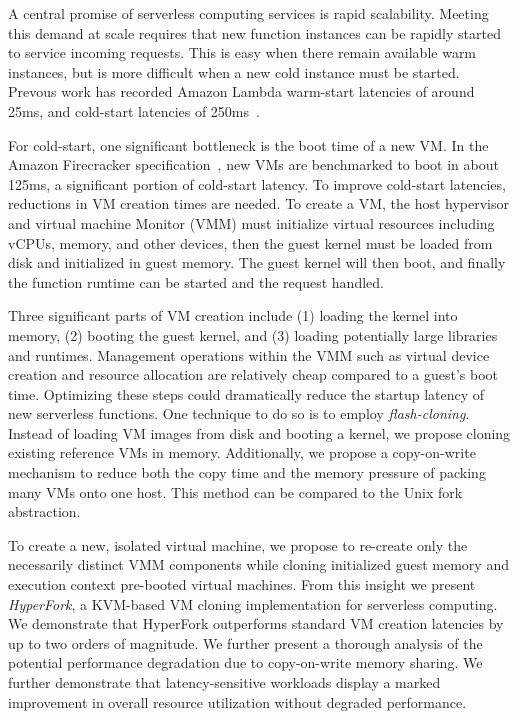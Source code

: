  A central promise of serverless computing
services is rapid scalability. Meeting this demand at scale requires that new
function instances can be rapidly started to service incoming requests. This is
easy when there remain available warm instances, but is more difficult when a
new cold instance must be started. Prevous work has recorded Amazon Lambda
warm-start latencies of around 25ms, and cold-start latencies of
250ms~\cite{peeking}.

For cold-start, one significant bottleneck is the boot time of a new VM. In the
Amazon Firecracker specification~\cite{firecracker-spec}, new VMs are
benchmarked to boot in about 125ms, a significant portion of cold-start
latency. To improve cold-start latencies, reductions in VM creation times are
needed. To create a VM, the host hypervisor and virtual machine Monitor (VMM)
must initialize virtual resources including vCPUs, memory, and other devices,
then the guest kernel must be loaded from disk and initialized in guest memory.
The guest kernel will then boot, and finally the function runtime can be
started and the request handled.

 Three significant parts of VM creation include (1)
loading the kernel into memory, (2) booting the guest kernel, and (3) loading
potentially large libraries and runtimes. Management operations within the VMM
such as virtual device creation and resource allocation are relatively cheap
compared to a guest's boot time. Optimizing these steps could dramatically
reduce the startup latency of new serverless functions. One technique to do so
is to employ \emph{flash-cloning}. Instead of loading VM images from disk and
booting a kernel, we propose cloning existing reference VMs in memory.
Additionally, we propose a copy-on-write mechanism to reduce both the copy time
and the memory pressure of packing many VMs onto one host. This method can be
compared to the Unix fork abstraction.

 To create a new, isolated virtual machine, we propose to
re-create only the necessarily distinct VMM components while cloning
initialized guest memory and execution context pre-booted virtual machines.
From this insight we present \emph{HyperFork}, a KVM-based VM cloning
implementation for serverless computing. We demonstrate that HyperFork
outperforms standard VM creation latencies by up to two orders of magnitude. We
further present a thorough analysis of the potential performance degradation
due to copy-on-write memory sharing. We further demonstrate that
latency-sensitive workloads display a marked improvement in overall resource
utilization without degraded performance.

